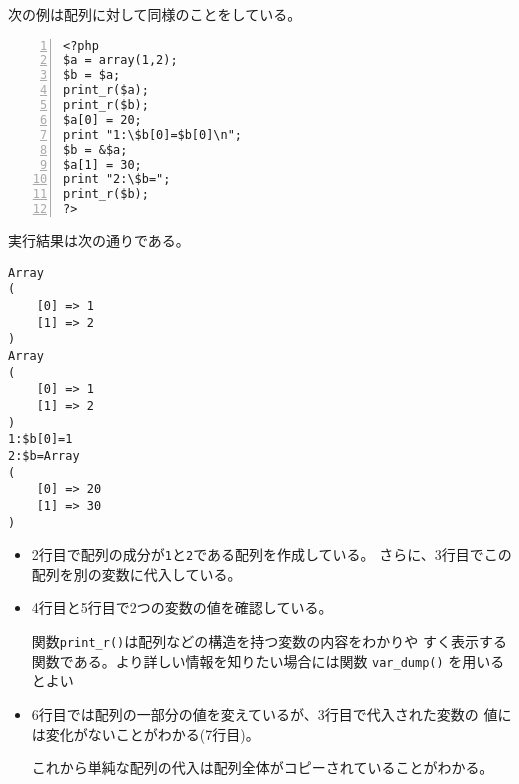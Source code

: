  \begin{Exec}\upshape
 次の例は配列に対して同様のことをしている。
\begin{Verbatim}[numbers=left]
<?php
$a = array(1,2);
$b = $a;
print_r($a);
print_r($b);
$a[0] = 20;
print "1:\$b[0]=$b[0]\n";
$b = &$a;
$a[1] = 30;
print "2:\$b=";
print_r($b);
?>
\end{Verbatim}
実行結果は次の通りである。
\begin{Verbatim}
Array
(
    [0] => 1
    [1] => 2
)
Array
(
    [0] => 1
    [1] => 2
)
1:$b[0]=1
2:$b=Array
(
    [0] => 20
    [1] => 30
)

\end{Verbatim}
\begin{itemize}
 \item 2行目で配列の成分が\texttt{1}と\texttt{2}である配列を作成している。
       さらに、3行目でこの配列を別の変数に代入している。
 \item 4行目と5行目で2つの変数の値を確認している。
       
      関数\texttt{print\_r()}は配列などの構造を持つ変数の内容をわかりや
 すく表示する関数である。より詳しい情報を知りたい場合には関数
       \texttt{var\_dump()} を用いるとよい
 \item 6行目では配列の一部分の値を変えているが、3行目で代入された変数の
       値には変化がないことがわかる(7行目)。

       これから単純な配列の代入は配列全体がコピーされていることがわかる。
\end{itemize}
\end{Exec}

 \fi
